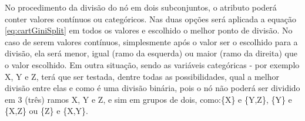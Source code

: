 No procedimento da divisão do nó em dois subconjuntos, o atributo poderá conter valores contínuos ou categóricos. Nas duas opções será aplicada a equação \ref{eq:cartGiniSplit} em todos os valores e escolhido o melhor ponto de divisão. No caso de serem valores contínuos, simplesmente após o valor ser o escolhido para a divisão, ela será menor, igual (ramo da esquerda) ou maior (ramo da direita) que o valor escolhido. Em outra situação, sendo as variáveis categóricas - por exemplo X, Y e Z, terá que ser testada, dentre todas as possibilidades, qual a melhor divisão entre elas e como é uma divisão binária, pois o nó não poderá ser dividido em 3 (três) ramos X, Y e Z, e sim em grupos de dois, como:\{X\} e \{Y,Z\}, \{Y\} e \{X,Z\} ou \{Z\} e \{X,Y\}.


% 
% 







